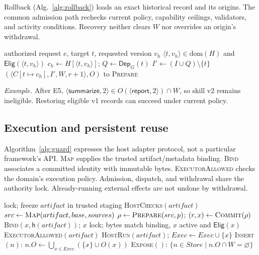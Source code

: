 \documentclass[letterpaper,journal]{IEEEtran}
\newcommand{\sv}[2]{\ensuremath{\langle\textsf{#1},#2\rangle}}
\newcommand{\vid}[2]{\ensuremath{\langle #1,#2\rangle}}
\DeclareRobustCommand{\circled}[1]{\expandafter\usebox\csname flowbadge#1\endcsname}
\begin{document}
Rollback (Alg.~\ref{alg:rollback}) loads an exact historical record and its origins. The common admission path rechecks current policy, capability ceilings, validators, and activity conditions. Recovery neither clears $W$ nor overrides an origin's withdrawal.

\begin{algorithm}[t]\caption{\textsc{Rollback}: construct a candidate}\label{alg:rollback}\footnotesize
\begin{algorithmic}[1]
\Require authorized request $e$, target $t$, requested version $v_h$
\State \Req $\vid{t}{v_h}\in\mathrm{dom}(H)$ and $\mathsf{Elig}(\vid{t}{v_h})$
\State $c_h\gets H[\vid{t}{v_h}]$; $Q\gets\mathsf{Dep}_{G}(t)$
\State $I'\gets (I\cup Q)\setminus\{t\}$
\State \Return $(\langle C[t\mapsto c_h],I',W,r{+}1\rangle,O)$ to \textsc{Prepare}
\end{algorithmic}\end{algorithm}

\textit{Example.} After E5, $\sv{summarize}{2}\in O(\sv{report}{2})\cap W$, so skill v2 remains ineligible. Restoring eligible v1 records can succeed under current policy.

\subsection{Execution and persistent reuse}\label{sec:integration}
Algorithm~\ref{alg:guard} expresses the host adapter protocol, not a particular framework's API. \textsc{Map} supplies the trusted artifact/metadata binding. \textsc{Bind} associates a committed identity with immutable bytes. \textsc{ExecutorAllowed} checks the domain's execution policy. Admission, dispatch, and withdrawal share the authority lock. Already-running external effects are not undone by withdrawal.

\begin{algorithm}[t]\caption{\textsc{Guard}: host acceptance, execution, and reuse (flows \circled{5} and \circled{6}; Eq.~\eqref{eq:use})}\label{alg:guard}\footnotesize
\begin{algorithmic}[1]
  \State lock; freeze $artifact$ in trusted staging
  \State \Req \textsc{HostChecks}$(artifact)$
  \State $src\gets\textsc{Map}(artifact,base,sources)$
  \State $\rho\gets\textsc{Prepare}(src,p)$; $(r,x)\gets\textsc{Commit}(\rho)$
  \State \textsc{Bind}$(x,\mathsf{h}(artifact))$; \Return $x$
\EndFunction
{}
  \State lock; \Req bytes match binding, $x$ active and $\mathsf{Elig}(x)$
  \State \Req \textsc{ExecutorAllowed}$(artifact)$
  \State \textsc{HostRun}$(artifact)$; $\mathit{Exec}\gets\mathit{Exec}\cup\{x\}$
\EndFunction
\State \textsc{Insert}$(n)$: $n.O\gets\bigcup_{x\in\mathit{Exec}}(\{x\}\cup O(x))$
\State \textsc{Expose}$()$: \Return $\{n\in\mathit{Store}\mid n.O\cap W=\varnothing\}$
\end{algorithmic}\end{algorithm}
\end{document}

